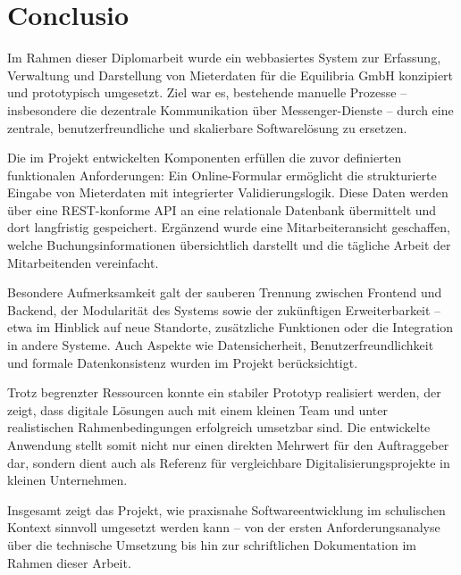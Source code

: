 \chapter{Conclusio} 

Im Rahmen dieser Diplomarbeit wurde ein webbasiertes System zur Erfassung, Verwaltung und Darstellung von Mieterdaten für die Equilibria GmbH konzipiert und prototypisch umgesetzt. Ziel war es, bestehende manuelle Prozesse – insbesondere die dezentrale Kommunikation über Messenger-Dienste – durch eine zentrale, benutzerfreundliche und skalierbare Softwarelösung zu ersetzen.

Die im Projekt entwickelten Komponenten erfüllen die zuvor definierten funktionalen Anforderungen: Ein Online-Formular ermöglicht die strukturierte Eingabe von Mieterdaten mit integrierter Validierungslogik. Diese Daten werden über eine REST-konforme API an eine relationale Datenbank übermittelt und dort langfristig gespeichert. Ergänzend wurde eine Mitarbeiteransicht geschaffen, welche Buchungsinformationen übersichtlich darstellt und die tägliche Arbeit der Mitarbeitenden vereinfacht.

Besondere Aufmerksamkeit galt der sauberen Trennung zwischen Frontend und Backend, der Modularität des Systems sowie der zukünftigen Erweiterbarkeit – etwa im Hinblick auf neue Standorte, zusätzliche Funktionen oder die Integration in andere Systeme. Auch Aspekte wie Datensicherheit, Benutzerfreundlichkeit und formale Datenkonsistenz wurden im Projekt berücksichtigt.

Trotz begrenzter Ressourcen konnte ein stabiler Prototyp realisiert werden, der zeigt, dass digitale Lösungen auch mit einem kleinen Team und unter realistischen Rahmenbedingungen erfolgreich umsetzbar sind. Die entwickelte Anwendung stellt somit nicht nur einen direkten Mehrwert für den Auftraggeber dar, sondern dient auch als Referenz für vergleichbare Digitalisierungsprojekte in kleinen Unternehmen.

Insgesamt zeigt das Projekt, wie praxisnahe Softwareentwicklung im schulischen Kontext sinnvoll umgesetzt werden kann – von der ersten Anforderungsanalyse über die technische Umsetzung bis hin zur schriftlichen Dokumentation im Rahmen dieser Arbeit.
